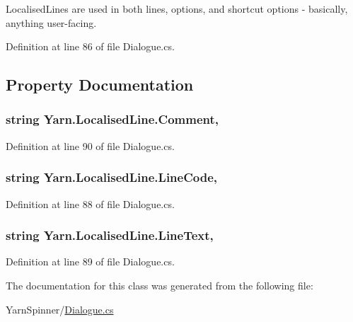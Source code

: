 Localised\-Lines are used in both lines, options, and shortcut options -\/ basically, anything user-\/facing. 

Definition at line 86 of file Dialogue.\-cs.



\subsection{Property Documentation}
\hypertarget{a00124_afbfb834bb1623653fa73945c221c4b9d}{
\subsubsection[{Comment}]{\setlength{\rightskip}{0pt plus 5cm}string Yarn.\-Localised\-Line.\-Comment\hspace{0.3cm}{\ttfamily [get]}, {\ttfamily [set]}}}\label{a00124_afbfb834bb1623653fa73945c221c4b9d}


Definition at line 90 of file Dialogue.\-cs.

\hypertarget{a00124_aad88f588cbbe2df9bb83da59eeff3d3c}{
\subsubsection[{Line\-Code}]{\setlength{\rightskip}{0pt plus 5cm}string Yarn.\-Localised\-Line.\-Line\-Code\hspace{0.3cm}{\ttfamily [get]}, {\ttfamily [set]}}}\label{a00124_aad88f588cbbe2df9bb83da59eeff3d3c}


Definition at line 88 of file Dialogue.\-cs.

\hypertarget{a00124_ab0b4fa82cfa7693ff3c96fe5c3837fff}{
\subsubsection[{Line\-Text}]{\setlength{\rightskip}{0pt plus 5cm}string Yarn.\-Localised\-Line.\-Line\-Text\hspace{0.3cm}{\ttfamily [get]}, {\ttfamily [set]}}}\label{a00124_ab0b4fa82cfa7693ff3c96fe5c3837fff}


Definition at line 89 of file Dialogue.\-cs.



The documentation for this class was generated from the following file\-:\begin{DoxyCompactItemize}
\item 
Yarn\-Spinner/\hyperlink{a00290}{Dialogue.\-cs}\end{DoxyCompactItemize}

